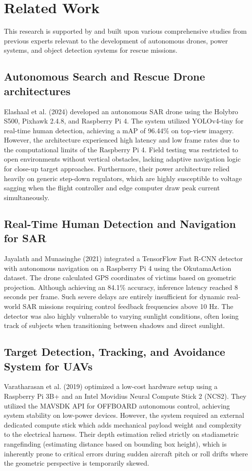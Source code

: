 \documentclass[conference]{IEEEtran}
\begin{document}
\section{Related Work}
This research is supported by and built upon various comprehensive studies from previous experts relevant to the development of autonomous drones, power systems, and object detection systems for rescue missions.

\subsection{Autonomous Search and Rescue Drone architectures}
Elashaal et al. (2024) \cite{b5} developed an autonomous SAR drone using the Holybro S500, Pixhawk 2.4.8, and Raspberry Pi 4. The system utilized YOLOv4-tiny for real-time human detection, achieving a mAP of 96.44\% on top-view imagery. However, the architecture experienced high latency and low frame rates due to the computational limits of the Raspberry Pi 4. Field testing was restricted to open environments without vertical obstacles, lacking adaptive navigation logic for close-up target approaches. Furthermore, their power architecture relied heavily on generic step-down regulators, which are highly susceptible to voltage sagging when the flight controller and edge computer draw peak current simultaneously.

\subsection{Real-Time Human Detection and Navigation for SAR}
Jayalath and Munasinghe (2021) \cite{b6} integrated a TensorFlow Fast R-CNN detector with autonomous navigation on a Raspberry Pi 4 using the OkutamaAction dataset. The drone calculated GPS coordinates of victims based on geometric projection. Although achieving an 84.1\% accuracy, inference latency reached 8 seconds per frame. Such severe delays are entirely insufficient for dynamic real-world SAR missions requiring control feedback frequencies above 10 Hz. The detector was also highly vulnerable to varying sunlight conditions, often losing track of subjects when transitioning between shadows and direct sunlight.

\subsection{Target Detection, Tracking, and Avoidance System for UAVs}
Varatharasan et al. (2019) \cite{b7} optimized a low-cost hardware setup using a Raspberry Pi 3B+ and an Intel Movidius Neural Compute Stick 2 (NCS2). They utilized the MAVSDK API for OFFBOARD autonomous control, achieving system stability on low-power devices. However, the system required an external dedicated compute stick which adds mechanical payload weight and complexity to the electrical harness. Their depth estimation relied strictly on stadiametric rangefinding (estimating distance based on bounding box height), which is inherently prone to critical errors during sudden aircraft pitch or roll drifts where the geometric perspective is temporarily skewed.
\end{document}
